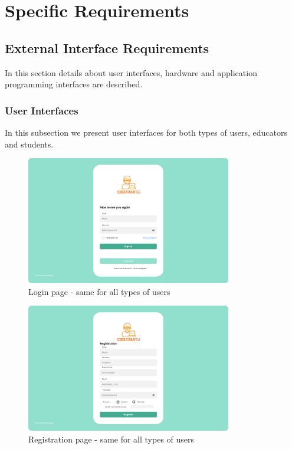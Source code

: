 \chapter{Specific Requirements}

\section{External Interface Requirements}
In this section details about user interfaces, 
hardware and application programming interfaces are described.

\subsection{User Interfaces}
In this subsection we present user interfaces for both types of users, educators and students.

\begin{figure}[H]
    \centering
    \includegraphics[width=0.8\textwidth]{images/user_interface/UI_sw2-01.png}
    \caption{Login page - same for all types of users}
\end{figure}

\begin{figure}[H]
    \centering
    \includegraphics[width=0.8\textwidth]{images/user_interface/UI_sw2-02.png}
    \caption{Registration page - same for all types of users}
\end{figure}

